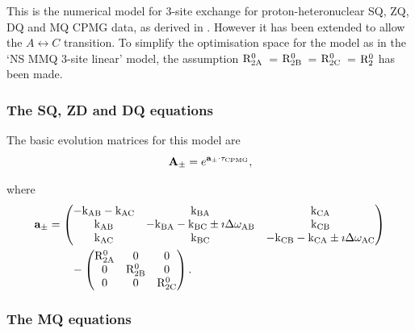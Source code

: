 This is the numerical model for 3-site exchange for proton-heteronuclear SQ, ZQ, DQ and MQ CPMG data, as derived in \citep{Korzhnev04a,Korzhnev04b,Korzhnev05}.
However it has been extended to allow the $A \leftrightarrow C$ transition.
To simplify the optimisation space for the model as in the `NS MMQ 3-site linear' model, the assumption $\mathrm{R}_\mathrm{2A}^0$~= $\mathrm{R}_\mathrm{2B}^0$~= $\mathrm{R}_\mathrm{2C}^0$~= $\mathrm{R}_2^0$ has been made.


\subsubsection{The SQ, ZD and DQ equations}

The basic evolution matrices for this model are
\begin{equation}
    \mathbf{A_\pm} = e^{\mathbf{a_\pm} \cdot \tau_\textrm{CPMG}},
\end{equation}

where
\begin{align}
    \mathbf{a_\pm} &= \begin{pmatrix}
                        -\textrm{k}_\textrm{AB} -\textrm{k}_\textrm{AC} & \textrm{k}_\textrm{BA}                          & \textrm{k}_\textrm{CA} \\
                        \textrm{k}_\textrm{AB}        & -\textrm{k}_\textrm{BA} -\textrm{k}_\textrm{BC} \pm\imath\Delta\omega_\textrm{AB}    & \textrm{k}_\textrm{CB} \\
                        \textrm{k}_\textrm{AC}        & \textrm{k}_\textrm{BC}                          & -\textrm{k}_\textrm{CB} -\textrm{k}_\textrm{CA} \pm\imath\Delta\omega_\textrm{AC}
                      \end{pmatrix}  \nonumber \\
                   &\qquad - \begin{pmatrix}
                               \mathrm{R}_\mathrm{2A}^0 & 0          & 0    \\
                               0          & \mathrm{R}_\mathrm{2B}^0 & 0    \\
                               0          & 0          & \mathrm{R}_\mathrm{2C}^0
                             \end{pmatrix}.
\end{align}


\subsubsection{The MQ equations}

